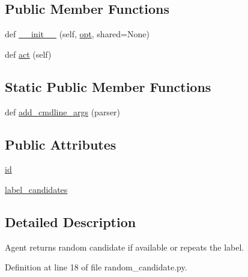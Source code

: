 \subsection*{Public Member Functions}
\begin{DoxyCompactItemize}
\item 
def \hyperlink{classparlai_1_1agents_1_1random__candidate_1_1random__candidate_1_1RandomCandidateAgent_a3c2a96128e8a9825e552d6e999e55490}{\+\_\+\+\_\+init\+\_\+\+\_\+} (self, \hyperlink{classparlai_1_1core_1_1agents_1_1Agent_ab3b45d2754244608c75d4068b90cd051}{opt}, shared=None)
\item 
def \hyperlink{classparlai_1_1agents_1_1random__candidate_1_1random__candidate_1_1RandomCandidateAgent_acb0a6e3c223f9e784a668d24b3e7fc82}{act} (self)
\end{DoxyCompactItemize}
\subsection*{Static Public Member Functions}
\begin{DoxyCompactItemize}
\item 
def \hyperlink{classparlai_1_1agents_1_1random__candidate_1_1random__candidate_1_1RandomCandidateAgent_adf32b766729393efc5fbdffee363f75a}{add\+\_\+cmdline\+\_\+args} (parser)
\end{DoxyCompactItemize}
\subsection*{Public Attributes}
\begin{DoxyCompactItemize}
\item 
\hyperlink{classparlai_1_1agents_1_1random__candidate_1_1random__candidate_1_1RandomCandidateAgent_adc2ff06b9b7e9463dc00dfa227fdc7d6}{id}
\item 
\hyperlink{classparlai_1_1agents_1_1random__candidate_1_1random__candidate_1_1RandomCandidateAgent_abd4570210c517ac8da9f269f8302f228}{label\+\_\+candidates}
\end{DoxyCompactItemize}


\subsection{Detailed Description}
\begin{DoxyVerb}Agent returns random candidate if available or repeats the label.
\end{DoxyVerb}
 

Definition at line 18 of file random\+\_\+candidate.\+py.



